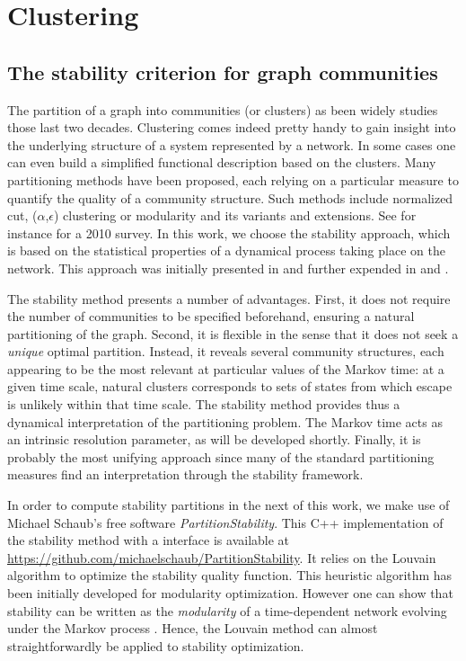 \chapter{Clustering} \label{chap:clustering}
\section{The stability criterion for graph communities} \label{sec:stability}
The partition of a graph into communities (or clusters) as been widely studies those last two decades. Clustering comes indeed pretty handy to gain insight into the underlying structure of a system represented by a network. In some cases one can even build a simplified functional description based on the clusters. Many partitioning methods have been proposed, each relying on a particular measure to quantify the quality of a community structure. Such methods include normalized cut, ($\alpha$,$\epsilon$) clustering or modularity and its variants and extensions. See for instance \cite{fortunato2010community} for a 2010 survey. In this work, we choose the stability approach, which is based on the statistical properties of a dynamical process taking place on the network. This approach was initially presented in \cite{delvenne2010stability} and further expended in \cite{lambiotte2009laplacian} and \cite{delvenne2013stability}. 

The stability method presents a number of advantages. First, it does not require the number of communities to be specified beforehand, ensuring a natural partitioning of the graph. Second, it is flexible in the sense that it does not seek a \textit{unique} optimal partition. Instead, it reveals several community structures, each appearing to be the most relevant at particular values of the Markov time: at a given time scale, natural clusters corresponds to sets of states from which escape is unlikely within that time scale. The stability method provides thus a dynamical interpretation of the partitioning problem. The Markov time acts as an intrinsic resolution parameter, as will be developed shortly. Finally, it is probably the most unifying approach since many of the standard partitioning measures find an interpretation through the stability framework.

In order to compute stability partitions in the next of this work, we make use of Michael Schaub's free software \textit{PartitionStability}. This C++ implementation of the stability method with a \matlab interface is available at \url{https://github.com/michaelschaub/PartitionStability}. It relies on the Louvain algorithm \cite{blondel2008fast} to optimize the stability quality function. This heuristic algorithm has been initially developed for modularity optimization. However one can show that stability can be written as the \textit{modularity} of a time-dependent network evolving under the Markov process \cite{lambiotte2009laplacian}. Hence, the Louvain method can almost straightforwardly be applied to stability optimization.

